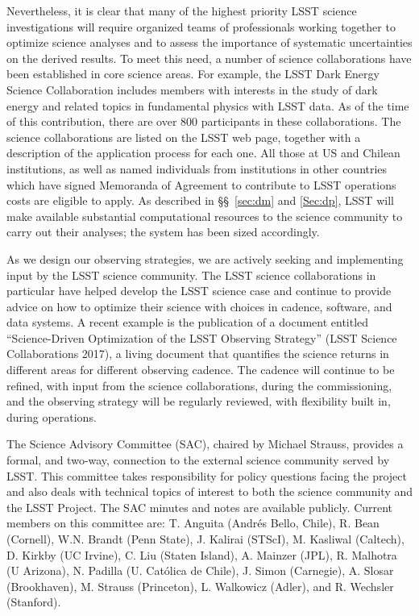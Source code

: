 Nevertheless, it is clear that many of the highest priority LSST science
investigations will require organized teams of professionals working together
to optimize science analyses and to assess the importance of systematic 
uncertainties on the derived results. To meet this need, a number of science
collaborations have been established in core science
areas. For example, the LSST Dark Energy Science Collaboration includes
members with interests in the study of dark energy and related topics in 
fundamental physics with LSST data. As of the time of this contribution, there are 
over 800 participants in these collaborations. %
The science collaborations are listed on the LSST web page, together
with a description of the application process for each one.  
All those at US and Chilean institutions,
as well as named individuals from institutions in other countries
which have signed Memoranda of Agreement to contribute to LSST
operations costs are eligible to apply. As described in
\S\S~\ref{sec:dm} and \ref{Sec:dp}, LSST will make available
substantial computational resources to the
science community to carry out their analyses; 
the system has been sized accordingly. 

As we design our observing strategies, we are actively seeking and implementing
input by the LSST science community.  The LSST science collaborations
in particular have helped develop the LSST science case and continue
to provide advice on how to optimize their science with choices in
cadence, software,  
and data systems. A recent example is the publication of a document
entitled ``Science-Driven Optimization of the LSST Observing
Strategy'' (LSST Science Collaborations 2017), a living document that
quantifies the science returns in different areas for different
observing cadence.  The cadence will continue to be refined, with
input from the science collaborations, during the commissioning, and
the observing strategy will be regularly reviewed, with flexibility
built in, during operations.  

The Science Advisory Committee (SAC), chaired by Michael Strauss,
provides a formal, and two-way, connection to the external science
community served by LSST. This committee takes responsibility for
policy questions facing the project and also deals with technical
topics of interest to both the science community and the LSST
Project. The SAC minutes and notes are available
publicly. Current members on this committee are: T. Anguita (Andr\'es
Bello, Chile), R. Bean (Cornell), W.N. Brandt
(Penn State), J. Kalirai (STScI), M. Kasliwal
(Caltech), D. Kirkby (UC Irvine), C. Liu (Staten Island), A. Mainzer
(JPL), R. Malhotra (U Arizona),
N. Padilla (U. Cat\'olica de Chile), J. Simon (Carnegie), A. Slosar
(Brookhaven), M. Strauss (Princeton), L. Walkowicz (Adler),
and R. Wechsler (Stanford). 

